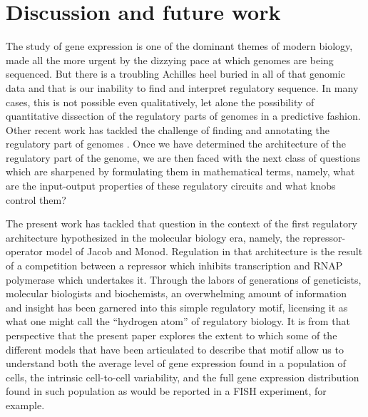 \section{Discussion and future work}

The study of gene expression is one of the dominant themes of modern biology,
made all the more urgent by the dizzying pace at which genomes are being
sequenced. But there is a troubling Achilles heel buried in all of that genomic
data and that is our inability to find and interpret regulatory sequence. In
many cases, this is not possible even qualitatively, let alone the possibility
of quantitative dissection of the regulatory parts of genomes in a predictive
fashion. Other recent work has tackled the challenge of finding and annotating
the regulatory part of genomes \cite{Belliveau2018, Ireland2020} . Once we have determined the architecture of the
regulatory part of the genome, we are then faced with the next class of
questions which are sharpened by formulating them in mathematical terms, namely,
what are the input-output properties of these regulatory circuits and what knobs
control them?

The present work has tackled that question in the context of the first
regulatory architecture hypothesized in the molecular biology era, namely, the
repressor-operator model of Jacob and Monod. Regulation in that architecture is
the result of a competition between a repressor which inhibits transcription and
RNAP polymerase which undertakes it. Through the labors of generations of
geneticists, molecular biologists and biochemists, an overwhelming amount of
information and insight has been garnered into this simple regulatory motif,
licensing it as what one might call the ``hydrogen atom'' of regulatory biology.
It is from that perspective that the present paper explores the extent to which
some of the different models that have been articulated to describe that motif
allow us to understand both the average level of gene expression found in a
population of cells, the intrinsic cell-to-cell variability, and the full gene
expression distribution found in such population as would be reported in a FISH
experiment, for example.

